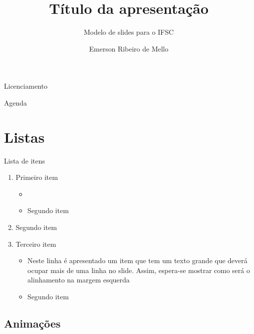 \documentclass[aspectratio=169]{beamer}
\title{Título da apresentação}
\subtitle{Modelo de slides para o IFSC}
\author{Emerson Ribeiro de Mello}
\institute{mello@ifsc.edu.br}
\begin{document}

\begin{frame}
    \maketitle
\end{frame}

\begin{frame}{Licenciamento}
    \licenciamentoLivre
\end{frame}

\begin{frame}{Agenda}
    \tableofcontents
\end{frame}


\section{Listas}


\begin{frame}{Lista de itens}
    \begin{enumerate}
        \item Primeiro item
        \begin{itemize}
            \item {}
            \item Segundo item
        \end{itemize}
        \item Segundo item
        \item Terceiro item 
        \begin{itemize}
            \item Neste linha é apresentado um item que tem um texto grande que deverá ocupar mais de uma linha no slide. Assim, espera-se mostrar como será o alinhamento na margem esquerda
            \item Segundo item
        \end{itemize}
    \end{enumerate}
\end{frame}

\subsection{Animações}
\end{document}
